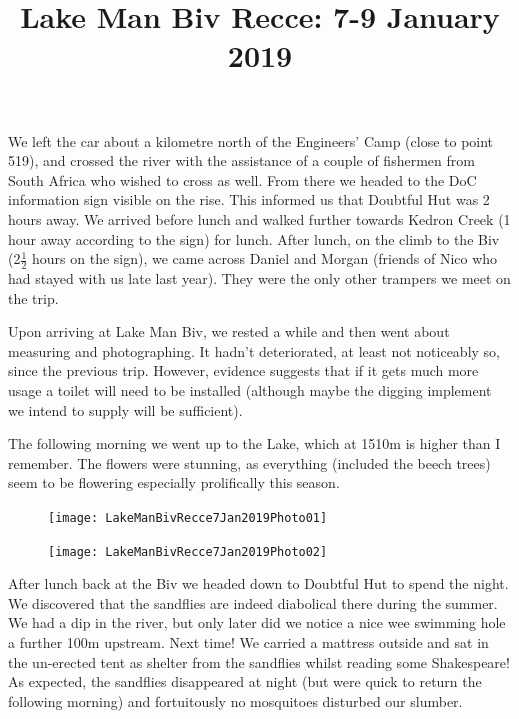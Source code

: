 \documentclass[12pt]{article} %
\title{Lake Man Biv Recce: 7-9 January 2019}
\makeatletter
\renewcommand{\maketitle}{%
  {\bfseries{\scshape{\Large{\@title\par}}}}
}
\makeatother
\begin{document}
  \maketitle
We left the car about a kilometre north of the Engineers' Camp (close to point 519), and crossed the river with the assistance of a couple of fishermen from South Africa who wished to cross as well.  From there we headed to the DoC information sign visible on the rise.  This informed us that Doubtful Hut was 2 hours away.  We arrived before lunch and walked further towards Kedron Creek (1 hour away according to the sign) for lunch.  After lunch, on the climb to the Biv (2$\frac{1}{2}$ hours on the sign), we came across Daniel and Morgan (friends of Nico who had stayed with us late last year).  They were the only other trampers we meet on the trip.

Upon arriving at Lake Man Biv, we rested a while and then went about measuring and photographing.  It hadn't deteriorated, at least not noticeably so, since the previous trip.  However, evidence suggests that if it gets much more usage a toilet will need to be installed (although maybe the digging implement we intend to supply will be sufficient).

The following morning we went up to the Lake, which at 1510m is higher than I remember.  The flowers were stunning, as everything (included the beech trees) seem to be flowering especially prolifically this season.

\begin{figure}[ht]
\begin{minipage}{.5\linewidth}
\begin{flushleft}
   \texttt{[image: LakeManBivRecce7Jan2019Photo01]}
\end{flushleft}
\end{minipage}
\begin{minipage}{.5\linewidth}
\begin{center}
   \texttt{[image: LakeManBivRecce7Jan2019Photo02]}
\end{center}
\end{minipage}
\end{figure}

After lunch back at the Biv we headed down to Doubtful Hut to spend the night.  We discovered that the sandflies are indeed diabolical there during the summer.  We had a dip in the river, but only later did we notice a nice wee swimming hole a further 100m upstream.  Next time!  We carried a mattress outside and sat in the un-erected tent as shelter from the sandflies whilst reading some Shakespeare!
As expected, the sandflies disappeared at night (but were quick to return the following morning) and fortuitously no mosquitoes disturbed our slumber.
\end{document}
